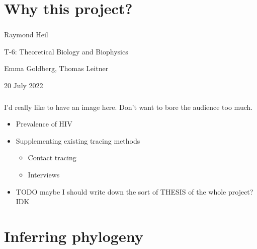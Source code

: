\documentclass[aspectratio=169]{beamer}
\begin{document}
\section{Why this project?}

\begin{frame} \frametitle{}

    \begin{center}

        \vfill

        Raymond Heil

        T-6: Theoretical Biology and Biophysics

        Emma Goldberg, Thomas Leitner

        \vfill

        \scriptsize{20 July 2022}

        \vfill
    \end{center}


\end{frame}

\begin{frame} \frametitle{\insertsection}

    I'd really like to have an image here. Don't want to bore
    the audience too much.

    \begin{itemize}
        \item Prevalence of HIV
        \item Supplementing existing tracing methods
        \begin {itemize}
            \item Contact tracing
            \item Interviews
        \end{itemize}
        \item TODO maybe I should write down the sort of THESIS of the whole project? IDK
    \end{itemize}

\end{frame}

\section{Inferring phylogeny}
\end{document}
